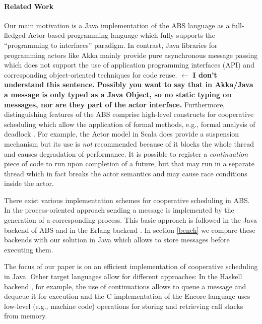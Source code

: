 \paragraph{Related Work}

Our main motivation is  a Java  implementation of the ABS language  as a full-fledged Actor-based programming language which fully supports   the ``programming to interfaces'' paradigm.
In contrast,  Java libraries for programming actors like Akka  \cite{Akka} mainly  provide  pure asynchronous  message passing which does not  support the use of application programming interfaces (API) and corresponding object-oriented techniques for code reuse.
$\leftarrow$ {\bfseries I don't understand this sentence. Possibly you want to say that in Akka/Java a message is only typed as a Java Object, so no static typing on messages, nor are they part of the actor interface.}
Furthermore,  distinguishing features of the ABS comprise  high-level constructs for cooperative scheduling which allow the application of formal methods, e.g.,
formal analysis of deadlock \cite{deadlock}.
For example,   the Actor model in Scala \cite{Scala} does provide a  suspension mechanism but its use is \emph{not} recommended because of it blocks the whole thread and causes
degradation of  performance.
It is possible to register a {\em continuation} piece of code to run upon completion of a future, but that may run in a separate thread which in fact breaks the actor semantics and may cause race conditions inside the actor.

There exist various implementation schemes for cooperative scheduling in ABS.
In the process-oriented approach sending a message  is implemented by the generation of a  corresponding process. This basic approach is followed in the Java backend of ABS \cite{abs,Schafer} and in the Erlang backend \cite{Erlang}.
In section \ref{bench} we compare these backends with our solution in Java which allows to store messages before executing them.

The focus of our paper is  on an efficient implementation of cooperative scheduling in Java.
Other target languages allow for different approaches:
In the Haskell backend \cite{Haskell}, for example,   the use of continuations allows
to queue  a message and dequeue it for execution and the C implementation of the
Encore language \cite{Encore}  uses low-level (e.g., machine code) operations for
storing and retrieving call stacks from memory.






